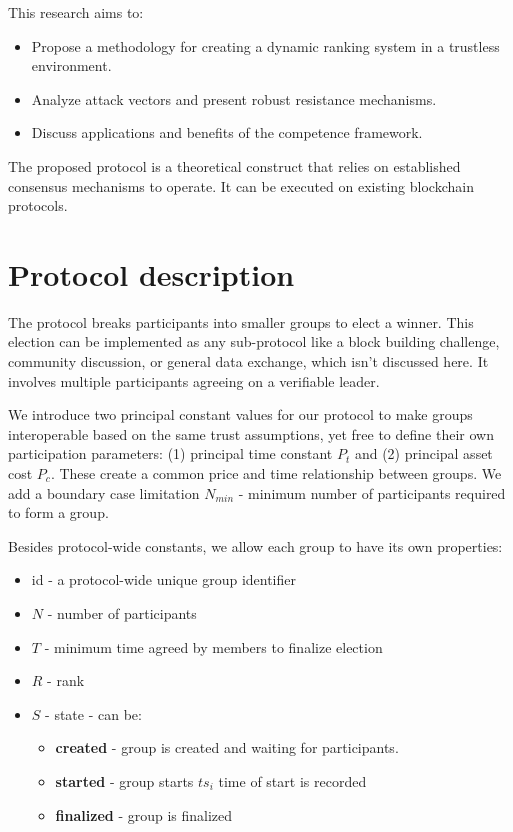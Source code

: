 \documentclass{article}
\begin{document}
\begin{CJK}{UTF8}{gbsn}
    This research aims to:

    \begin{itemize}[nosep]
        \item Propose a methodology for creating a dynamic ranking system in a trustless environment.
        \item Analyze attack vectors and present robust resistance mechanisms.
        \item Discuss applications and benefits of the competence framework.
    \end{itemize}

    The proposed protocol is a theoretical construct that relies on established consensus mechanisms to operate. It can be executed on existing blockchain protocols.

    \section{Protocol description}

    The protocol breaks participants into smaller groups to elect a winner. This election can be implemented as any sub-protocol like a block building challenge, community discussion, or general data exchange, which isn’t discussed here. It involves multiple participants agreeing on a verifiable leader.

    We introduce two principal constant values for our protocol to make groups interoperable based on the same trust assumptions, yet free to define their own participation parameters: (1) principal time constant $P_t$ and (2) principal asset cost $P_c$. These create a common price and time relationship between groups. We add a boundary case limitation $N_{min}$ - minimum number of participants required to form a group.

    Besides protocol-wide constants, we allow each group to have its own properties:

    \begin{itemize}[nosep]
        \item id - a protocol-wide unique group identifier
        \item $N$ - number of participants
        \item $T$ - minimum time agreed by members to finalize election
        \item $R$ - rank
        \item $S$ - state - can be:
              \begin{itemize}[nosep]
                  \item \textbf{created} - group is created and waiting for participants.
                  \item \textbf{started} - group starts $ts_i$ time of start is recorded
                  \item \textbf{finalized} - group is finalized
              \end{itemize}
    \end{itemize}


\end{CJK}
\end{document}
